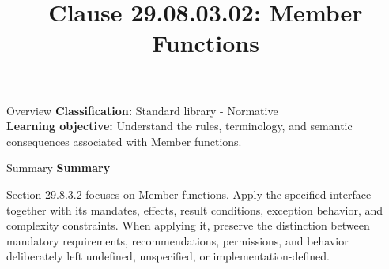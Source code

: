 \documentclass[10pt,letterpaper]{article}
\title{Clause 29.08.03.02: Member Functions}
\author{}
\date{}
\begin{document}
\maketitle
\begin{CornellOverviewBox}{Overview}
\textbf{Classification:} Standard library - Normative\\[2pt]
\textbf{Learning objective:} Understand the rules, terminology, and semantic consequences associated with Member functions.
\end{CornellOverviewBox}\begin{CornellSummaryBox}{Summary}
{\sffamily\bfseries\color{Accent} Summary}\par\vspace{3pt}Section 29.8.3.2 focuses on Member functions. Apply the specified interface together with its mandates, effects, result conditions, exception behavior, and complexity constraints. When applying it, preserve the distinction between mandatory requirements, recommendations, permissions, and behavior deliberately left undefined, unspecified, or implementation-defined.
\end{CornellSummaryBox}
\end{document}
